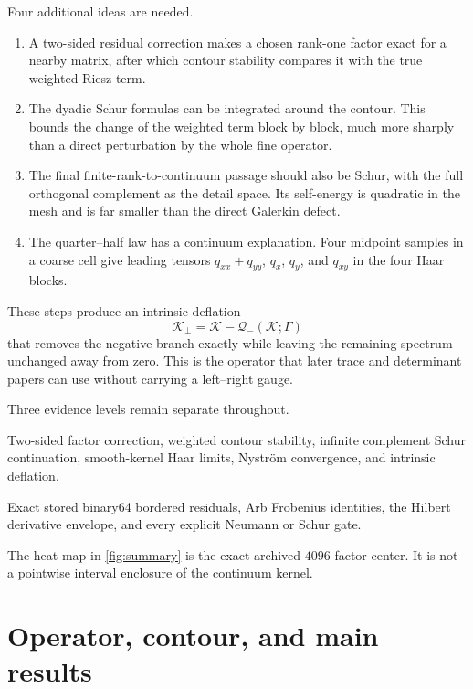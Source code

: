 \documentclass[11pt]{article}
\theoremstyle{definition}
\theoremstyle{remark}
\newcommand{\cK}{\mathcal K}
\newcommand{\cQ}{\mathcal Q}
\begin{document}
Four additional ideas are needed.
\begin{enumerate}[leftmargin=2em]
 \item A two-sided residual correction makes a chosen rank-one factor exact
       for a nearby matrix, after which contour stability compares it with
       the true weighted Riesz term.
 \item The dyadic Schur formulas can be integrated around the contour.  This
       bounds the change of the weighted term block by block, much more
       sharply than a direct perturbation by the whole fine operator.
 \item The final finite-rank-to-continuum passage should also be Schur, with
       the full orthogonal complement as the detail space.  Its self-energy
       is quadratic in the mesh and is far smaller than the direct
       Galerkin defect.
 \item The quarter--half law has a continuum explanation.  Four midpoint
       samples in a coarse cell give leading tensors
       $q_{xx}+q_{yy}$, $q_x$, $q_y$, and $q_{xy}$ in the four Haar blocks.
\end{enumerate}

These steps produce an intrinsic deflation
\[
 \cK_\perp=\cK-\cQ_-(\cK;\Gamma)
\]
that removes the negative branch exactly while leaving the remaining
spectrum unchanged away from zero.  This is the operator that later trace
and determinant papers can use without carrying a left--right gauge.

Three evidence levels remain separate throughout.
\begin{description}[leftmargin=3.2cm,style=nextline]
 \item[Analytic theorem]
 Two-sided factor correction, weighted contour stability, infinite
 complement Schur continuation, smooth-kernel Haar limits, Nystr\"om
 convergence, and intrinsic deflation.
 \item[Outward certificate]
 Exact stored binary64 bordered residuals, Arb Frobenius identities, the
 Hilbert derivative envelope, and every explicit Neumann or Schur gate.
 \item[Displayed center]
 The heat map in \cref{fig:summary} is the exact archived $4096$ factor
 center.  It is not a pointwise interval enclosure of the continuum kernel.
\end{description}

\section{Operator, contour, and main results}
\label{sec:model}
\end{document}
